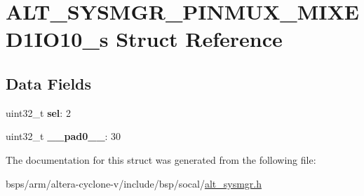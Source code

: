 \hypertarget{structALT__SYSMGR__PINMUX__MIXED1IO10__s}{}\section{A\+L\+T\+\_\+\+S\+Y\+S\+M\+G\+R\+\_\+\+P\+I\+N\+M\+U\+X\+\_\+\+M\+I\+X\+E\+D1\+I\+O10\+\_\+s Struct Reference}
\label{structALT__SYSMGR__PINMUX__MIXED1IO10__s}
\subsection*{Data Fields}
\begin{DoxyCompactItemize}
\item 
\mbox{\label{structALT__SYSMGR__PINMUX__MIXED1IO10__s_aa810729b7f2655c51dcc1953c07046ee}} 
uint32\+\_\+t {\bfseries sel}\+: 2
\item 
\mbox{\label{structALT__SYSMGR__PINMUX__MIXED1IO10__s_aa9041a7cc3074e1ce4421d7668ec6418}} 
uint32\+\_\+t {\bfseries \+\_\+\+\_\+pad0\+\_\+\+\_\+}\+: 30
\end{DoxyCompactItemize}


The documentation for this struct was generated from the following file\+:\begin{DoxyCompactItemize}
\item 
bsps/arm/altera-\/cyclone-\/v/include/bsp/socal/\mbox{\hyperlink{alt__sysmgr_8h}{alt\+\_\+sysmgr.\+h}}\end{DoxyCompactItemize}
